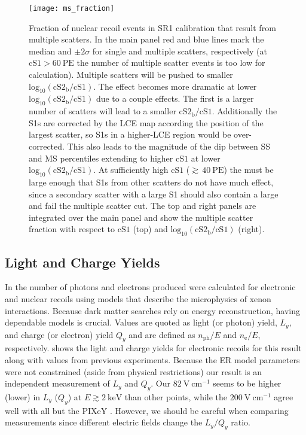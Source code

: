 \begin{figure}
\centering
\texttt{[image: ms\_fraction]}
\caption{Fraction of nuclear recoil events in SR1 \ambe calibration that result from multiple scatters.  In the main panel red and
blue lines mark the median and $\pm 2\sigma$ for single and multiple scatters, respectively (at $\mathrm{cS1} > 60\ \mathrm{PE}$ the
number of multiple scatter events is too low for calculation).  Multiple scatters will be pushed to smaller
$\mathrm{log}_{10}(\mathrm{cS2_b / cS1})$.  The effect becomes more dramatic at lower
$\mathrm{log}_{10}(\mathrm{cS2_b / cS1})$ due to a couple effects.  The first is a larger number of scatters will lead to a
smaller $\mathrm{cS2_b / cS1}$.  Additionally the S1s are corrected by the LCE map
according the position of the largest scatter, so S1s in a higher-LCE region
would be over-corrected.  This also leads to the magnitude of the dip between SS and MS percentiles extending to higher $\mathrm{cS1}$
at lower $\mathrm{log}_{10}(\mathrm{cS2_b / cS1})$.  At sufficiently high $\mathrm{cS1}$ (${\gtrsim}\, 40\ \mathrm{PE}$) the
\cstwob must be large enough that S1s from other scatters do not have much effect, since a secondary scatter with a large S1 should also
contain a large \stwob and fail the multiple scatter cut.  The top and right panels are integrated over the main panel and show the
multiple scatter fraction with respect to $\mathrm{cS1}$ (top) and $\mathrm{log}_{10}(\mathrm{cS2_b / cS1})$ (right).}
\label{fig:er_nr_calibrations_results_ms_fraction}
\end{figure}



\subsection{Light and Charge Yields}
\label{subsec:er_nr_calibrations_results_ly_qy}
In  the number
of photons and electrons produced were calculated for electronic and nuclear recoils using models that describe
the microphysics of xenon interactions.  Because dark matter searches rely on energy reconstruction, having dependable models is
crucial.  Values are quoted as light (or photon) yield, $L_y$, and charge (or electron) yield $Q_y$ and are defined as
$n_{\mathrm{ph}}/E$ and $n_{\mathrm{e}} / E$, respectively.   shows the light and
charge yields for electronic recoils for this result along with values from previous experiments.  Because the ER model parameters were
not constrained (aside from physical restrictions) our result is an independent measurement of $L_y$ and $Q_y$.  Our
$82\ \mathrm{V\ cm^{-1}}$ seems to be higher (lower) in $L_y$ ($Q_y$) at $E \gtrsim 2\ \mathrm{keV}$ than
other points, while the $200\ \mathrm{V\ cm^{-1}}$ agree well with all but the PIXeY .  However, we should be careful when
comparing measurements since different electric fields change the $L_y/Q_y$ ratio.

